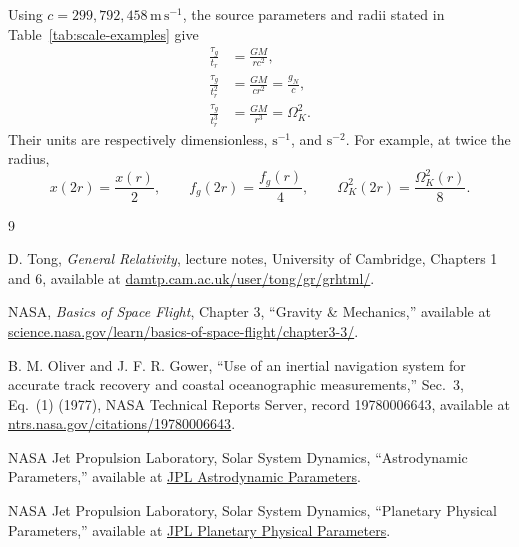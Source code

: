 \documentclass[12pt]{article}
\begin{document}
Using $c=299{,}792{,}458\,\mathrm{m\,s^{-1}}$, the source parameters and radii stated in Table~\ref{tab:scale-examples} give
\begin{align}
  \frac{\tau_g}{t_r}
  &=\frac{GM}{rc^2},\\
  \frac{\tau_g}{t_r^2}
  &=\frac{GM}{cr^2}
    =\frac{g_N}{c},\\
  \frac{\tau_g}{t_r^3}
  &=\frac{GM}{r^3}
    =\Omega_K^2.
  \label{eq:dimension-checks}
\end{align}
Their units are respectively dimensionless, $\mathrm{s^{-1}}$, and $\mathrm{s^{-2}}$. For example, at twice the radius,
\begin{equation}
  x(2r)=\frac{x(r)}{2},
  \qquad
  f_g(2r)=\frac{f_g(r)}{4},
  \qquad
  \Omega_K^2(2r)=\frac{\Omega_K^2(r)}{8}.
  \label{eq:doubling-check}
\end{equation}

\begin{thebibliography}{9}
\small
{}
\raggedright
{}

D. Tong,
\emph{General Relativity},
lecture notes, University of Cambridge, Chapters 1 and 6,
available at \href{https://www.damtp.cam.ac.uk/user/tong/gr/grhtml/}{damtp.cam.ac.uk/user/tong/gr/grhtml/}.

NASA,
\emph{Basics of Space Flight},
Chapter 3, ``Gravity \& Mechanics,''
available at \href{https://science.nasa.gov/learn/basics-of-space-flight/chapter3-3/}{science.nasa.gov/learn/basics-of-space-flight/chapter3-3/}.

B. M. Oliver and J. F. R. Gower,
``Use of an inertial navigation system for accurate track recovery and coastal oceanographic measurements,''
Sec.~3, Eq.~(1) (1977), NASA Technical Reports Server, record 19780006643,
available at \href{https://ntrs.nasa.gov/citations/19780006643}{ntrs.nasa.gov/citations/19780006643}.

NASA Jet Propulsion Laboratory,
Solar System Dynamics, ``Astrodynamic Parameters,''
available at \href{https://ssd.jpl.nasa.gov/astro_par.html}{JPL Astrodynamic Parameters}.

NASA Jet Propulsion Laboratory,
Solar System Dynamics, ``Planetary Physical Parameters,''
available at \href{https://ssd.jpl.nasa.gov/planets/phys_par.html}{JPL Planetary Physical Parameters}.

\end{thebibliography}
\end{document}
